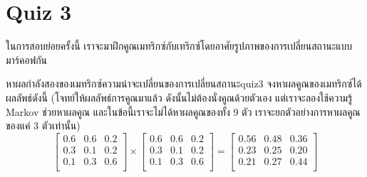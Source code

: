 \section*{Quiz 3}
ในการสอบย่อยครั้งนี้ เราจะมาฝึกคูณเมทริกซ์กับเทริกซ์โดยอาศัยรูปภาพของการเปลี่ยนสถานะแบบมาร์คอฟกัน
\begin{exercise}{หาผลกำลังสองของเมทริกซ์ความน่าจะเปลี่ยนของการเปลี่ยนสถานะ}{quiz3}
	จงหาผลคูณของเมทริกซ์ได้ผลลัพธ์ดังนี้ (โจทย์ให้ผลลัพธ์การคูณมาแล้ว ดังนั้นไม่ต้องนั่งคูณด้วยตัวเอง แต่เราจะลองใช้ความรู้ Markov ช่วยหาผลคูณ และในข้อนี้เราจะไม่ได้หาผลคูณของทั้ง 9 ตัว เราจะยกตัวอย่างการหาผลคูณของแค่ 3 ตัวเท่านั้น)
	$$
	\begin{bmatrix}
		0.6 & 0.6 & 0.2 \\
		0.3 & 0.1 & 0.2 \\
		0.1 & 0.3 & 0.6 \\
	\end{bmatrix} \times
	\begin{bmatrix}
		0.6 & 0.6 & 0.2 \\
		0.3 & 0.1 & 0.2 \\
		0.1 & 0.3 & 0.6 \\
	\end{bmatrix}
	=
	\begin{bmatrix}
		0.56 & 0.48 & 0.36 \\
		0.23 & 0.25 & 0.20 \\
		0.21 & 0.27 & 0.44 \\
	\end{bmatrix}
	$$
\end{exercise}

